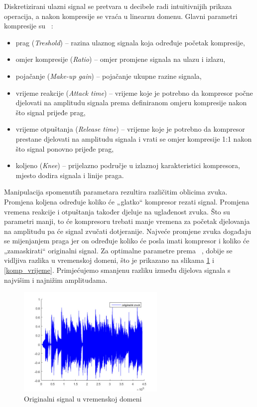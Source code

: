 \documentclass[conference]{IEEEtran}
\begin{document}
Diskretizirani ulazni signal se pretvara u decibele radi intuitivnijih prikaza %
 operacija, a nakon kompresije se vraća u linearnu domenu. Glavni parametri kompresije su ~\cite{b3}:
 \begin{itemize}
   \item{prag (\textit{Treshold}) – razina ulaznog signala koja određuje početak kompresije,}
   \item{omjer kompresije (\textit{Ratio}) – omjer promjene signala na ulazu i izlazu,}
   \item{pojačanje (\textit{Make-up gain}) – pojačanje ukupne razine signala,}
   \item{vrijeme reakcije (\textit{Attack time}) – vrijeme koje je potrebno da kompresor počne djelovati na
   amplitudu signala prema definiranom omjeru kompresije nakon što signal prijeđe prag,}
   \item{vrijeme otpuštanja (\textit{Release time}) – vrijeme koje je potrebno da kompresor prestane djelovati na
   amplitudu signala i vrati se omjer kompresije 1:1 nakon što signal ponovno prijeđe prag,}
   \item{koljeno (\textit{Knee}) – prijelazno područje u izlaznoj karakteristici kompresora, %
   mjesto dodira signala i linije praga.}
 \end{itemize}

 Manipulacija spomenutih parametara rezultira različitim oblicima zvuka. Promjena koljena određuje koliko će
 „glatko“ kompresor rezati signal. Promjena vremena reakcije i otpuštanja također djeluje na uglađenost zvuka.
 Što su parametri manji, to će kompresoru trebati manje vremena za početak djelovanja na amplitudu pa će signal
 zvučati dotjeranije. Najveće promjene zvuka događaju se mijenjanjem praga jer on određuje koliko će posla imati
 kompresor i koliko će „zamaskirati“ originalni signal. Za optimalne parametre prema ~\cite{b2}, dobije se vidljiva
 razlika u vremenskoj domeni, što je prikazano na slikama \ref{ulaz_vrijeme} i \ref{komp_vrijeme}.
 Primjećujemo smanjenu razliku između dijelova signala s najvišim i najnižim amplitudama.


\begin{figure}[H]
    \includegraphics[width=200pt]{slike/def_orig.jpg}
    \centering
    \caption{Originalni signal u vremenskoj domeni}							%
    \label{ulaz_vrijeme}
\end{figure}
\end{document}
